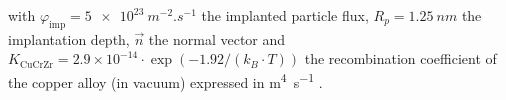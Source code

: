 with $\varphi_\mathrm{imp} = \SI{5e23}{m^{-2}.s^{-1}}$ the implanted particle flux, $R_p = \SI{1.25}{nm}$ the implantation depth, $\vec{n}$ the normal vector and $K_\mathrm{CuCrZr} = 2.9 \times 10^{-14}\cdot \exp{(-1.92/(k_B\cdot T))}$ the recombination coefficient of the copper alloy (in vacuum) expressed in \si{m^4.s^{-1}} .







